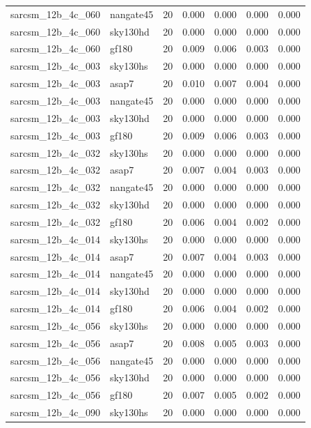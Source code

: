 \begin{tabular}{llrrrrr}
sarcsm\_12b\_4c\_060 & nangate45 & 20 & 0.000 & 0.000 & 0.000 & 0.000 \\
sarcsm\_12b\_4c\_060 & sky130hd & 20 & 0.000 & 0.000 & 0.000 & 0.000 \\
sarcsm\_12b\_4c\_060 & gf180 & 20 & 0.009 & 0.006 & 0.003 & 0.000 \\
sarcsm\_12b\_4c\_003 & sky130hs & 20 & 0.000 & 0.000 & 0.000 & 0.000 \\
sarcsm\_12b\_4c\_003 & asap7 & 20 & 0.010 & 0.007 & 0.004 & 0.000 \\
sarcsm\_12b\_4c\_003 & nangate45 & 20 & 0.000 & 0.000 & 0.000 & 0.000 \\
sarcsm\_12b\_4c\_003 & sky130hd & 20 & 0.000 & 0.000 & 0.000 & 0.000 \\
sarcsm\_12b\_4c\_003 & gf180 & 20 & 0.009 & 0.006 & 0.003 & 0.000 \\
sarcsm\_12b\_4c\_032 & sky130hs & 20 & 0.000 & 0.000 & 0.000 & 0.000 \\
sarcsm\_12b\_4c\_032 & asap7 & 20 & 0.007 & 0.004 & 0.003 & 0.000 \\
sarcsm\_12b\_4c\_032 & nangate45 & 20 & 0.000 & 0.000 & 0.000 & 0.000 \\
sarcsm\_12b\_4c\_032 & sky130hd & 20 & 0.000 & 0.000 & 0.000 & 0.000 \\
sarcsm\_12b\_4c\_032 & gf180 & 20 & 0.006 & 0.004 & 0.002 & 0.000 \\
sarcsm\_12b\_4c\_014 & sky130hs & 20 & 0.000 & 0.000 & 0.000 & 0.000 \\
sarcsm\_12b\_4c\_014 & asap7 & 20 & 0.007 & 0.004 & 0.003 & 0.000 \\
sarcsm\_12b\_4c\_014 & nangate45 & 20 & 0.000 & 0.000 & 0.000 & 0.000 \\
sarcsm\_12b\_4c\_014 & sky130hd & 20 & 0.000 & 0.000 & 0.000 & 0.000 \\
sarcsm\_12b\_4c\_014 & gf180 & 20 & 0.006 & 0.004 & 0.002 & 0.000 \\
sarcsm\_12b\_4c\_056 & sky130hs & 20 & 0.000 & 0.000 & 0.000 & 0.000 \\
sarcsm\_12b\_4c\_056 & asap7 & 20 & 0.008 & 0.005 & 0.003 & 0.000 \\
sarcsm\_12b\_4c\_056 & nangate45 & 20 & 0.000 & 0.000 & 0.000 & 0.000 \\
sarcsm\_12b\_4c\_056 & sky130hd & 20 & 0.000 & 0.000 & 0.000 & 0.000 \\
sarcsm\_12b\_4c\_056 & gf180 & 20 & 0.007 & 0.005 & 0.002 & 0.000 \\
sarcsm\_12b\_4c\_090 & sky130hs & 20 & 0.000 & 0.000 & 0.000 & 0.000 \\

\end{tabular}
